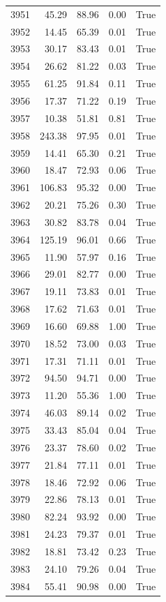 \begin{longtable}{rrrrr}
3951 & 45.29 & 88.96 & 0.00 & True \\
3952 & 14.45 & 65.39 & 0.01 & True \\
3953 & 30.17 & 83.43 & 0.01 & True \\
3954 & 26.62 & 81.22 & 0.03 & True \\
3955 & 61.25 & 91.84 & 0.11 & True \\
3956 & 17.37 & 71.22 & 0.19 & True \\
3957 & 10.38 & 51.81 & 0.81 & True \\
3958 & 243.38 & 97.95 & 0.01 & True \\
3959 & 14.41 & 65.30 & 0.21 & True \\
3960 & 18.47 & 72.93 & 0.06 & True \\
3961 & 106.83 & 95.32 & 0.00 & True \\
3962 & 20.21 & 75.26 & 0.30 & True \\
3963 & 30.82 & 83.78 & 0.04 & True \\
3964 & 125.19 & 96.01 & 0.66 & True \\
3965 & 11.90 & 57.97 & 0.16 & True \\
3966 & 29.01 & 82.77 & 0.00 & True \\
3967 & 19.11 & 73.83 & 0.01 & True \\
3968 & 17.62 & 71.63 & 0.01 & True \\
3969 & 16.60 & 69.88 & 1.00 & True \\
3970 & 18.52 & 73.00 & 0.03 & True \\
3971 & 17.31 & 71.11 & 0.01 & True \\
3972 & 94.50 & 94.71 & 0.00 & True \\
3973 & 11.20 & 55.36 & 1.00 & True \\
3974 & 46.03 & 89.14 & 0.02 & True \\
3975 & 33.43 & 85.04 & 0.04 & True \\
3976 & 23.37 & 78.60 & 0.02 & True \\
3977 & 21.84 & 77.11 & 0.01 & True \\
3978 & 18.46 & 72.92 & 0.06 & True \\
3979 & 22.86 & 78.13 & 0.01 & True \\
3980 & 82.24 & 93.92 & 0.00 & True \\
3981 & 24.23 & 79.37 & 0.01 & True \\
3982 & 18.81 & 73.42 & 0.23 & True \\
3983 & 24.10 & 79.26 & 0.04 & True \\
3984 & 55.41 & 90.98 & 0.00 & True \\

\end{longtable}
